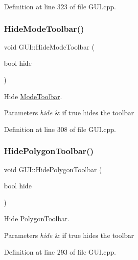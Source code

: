 Definition at line 323 of file G\+U\+I.\+cpp.

\mbox{\label{classGUI_a9517c0ad1e4c2b39faab8050f8133151}} 
\subsubsection{\texorpdfstring{Hide\+Mode\+Toolbar()}{HideModeToolbar()}}
{\footnotesize\ttfamily void G\+U\+I\+::\+Hide\+Mode\+Toolbar (\begin{DoxyParamCaption}\item[{bool}]{hide }\end{DoxyParamCaption})}



Hide \mbox{\hyperlink{structModeToolbar}{Mode\+Toolbar}}. 


\begin{DoxyParams}{Parameters}
{\em hide} & if true hides the toolbar \\
\hline
\end{DoxyParams}


Definition at line 308 of file G\+U\+I.\+cpp.

\mbox{\label{classGUI_aaf633cd0904e4c3627c21219f330c177}} 
\subsubsection{\texorpdfstring{Hide\+Polygon\+Toolbar()}{HidePolygonToolbar()}}
{\footnotesize\ttfamily void G\+U\+I\+::\+Hide\+Polygon\+Toolbar (\begin{DoxyParamCaption}\item[{bool}]{hide }\end{DoxyParamCaption})}



Hide \mbox{\hyperlink{structPolygonToolbar}{Polygon\+Toolbar}}. 


\begin{DoxyParams}{Parameters}
{\em hide} & if true hides the toolbar \\
\hline
\end{DoxyParams}


Definition at line 293 of file G\+U\+I.\+cpp.


